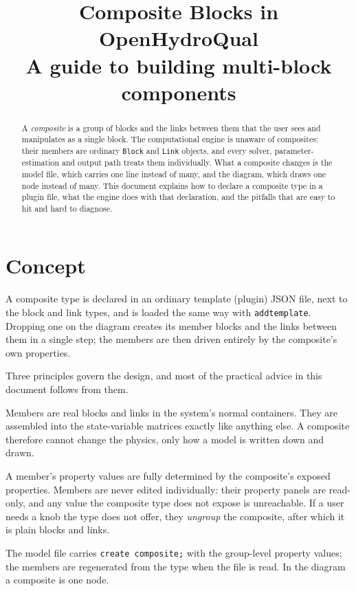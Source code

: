 \documentclass[11pt,a4paper]{article}
\title{\textbf{Composite Blocks in OpenHydroQual}\\[0.3em]
       \large A guide to building multi-block components}
\author{}
\date{}
\newcommand{\code}[1]{\texttt{\small #1}}
\begin{document}
\maketitle
\vspace{-2.5em}

\begin{abstract}
\noindent
A \emph{composite} is a group of blocks and the links between them that the
user sees and manipulates as a single block. The computational engine is
unaware of composites: their members are ordinary \code{Block} and \code{Link}
objects, and every solver, parameter-estimation and output path treats them
individually. What a composite changes is the model file, which carries one
line instead of many, and the diagram, which draws one node instead of many.
This document explains how to declare a composite type in a plugin file, what
the engine does with that declaration, and the pitfalls that are easy to hit
and hard to diagnose.
\end{abstract}

\tableofcontents

\section{Concept}

A composite type is declared in an ordinary template (plugin) JSON file, next
to the block and link types, and is loaded the same way with
\code{addtemplate}. Dropping one on the diagram creates its member blocks and
the links between them in a single step; the members are then driven entirely
by the composite's own properties.

Three principles govern the design, and most of the practical advice in this
document follows from them.

\begin{description}[style=nextline,leftmargin=1.2em]
\item[The engine never sees a composite.]
Members are real blocks and links in the system's normal containers. They are
assembled into the state-variable matrices exactly like anything else. A
composite therefore cannot change the physics, only how a model is written
down and drawn.

\item[Members are strictly encapsulated.]
A member's property values are fully determined by the composite's exposed
properties. Members are never edited individually: their property panels are
read-only, and any value the composite type does not expose is unreachable. If
a user needs a knob the type does not offer, they \emph{ungroup} the composite,
after which it is plain blocks and links.

\item[The composite is the unit of saving and of drawing, not of computing.]
The model file carries \code{create composite;} with the group-level property
values; the members are regenerated from the type when the file is read. In the
diagram a composite is one node.
\end{description}
\end{document}
